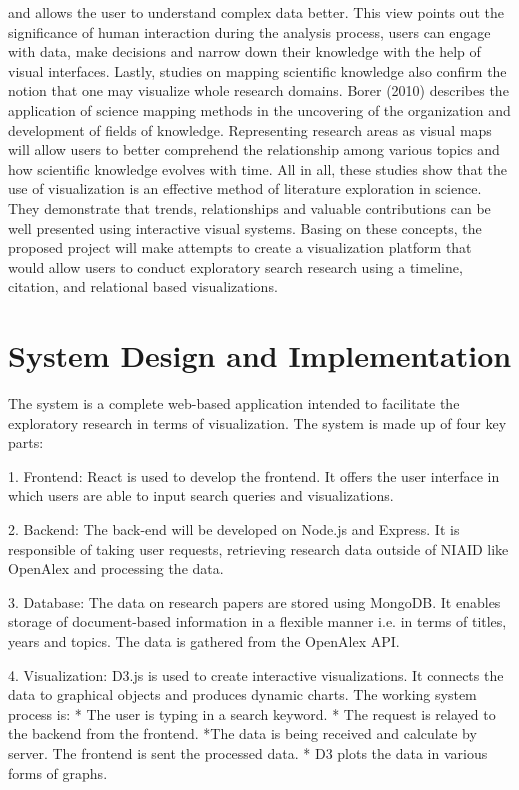 \documentclass[sigconf]{acmart}
\begin{document}
and allows the user to understand complex data better. This view points out the significance of human interaction during the analysis process, users can engage with data, make decisions and narrow down their knowledge with the help of visual interfaces. Lastly, studies on mapping scientific knowledge also confirm the notion that one may visualize whole research domains. Borer (2010) describes the application of science mapping methods in the uncovering of the organization and development of fields of knowledge. Representing research areas as visual maps will allow users to better comprehend the relationship among various topics and how scientific knowledge evolves with time. All in all, these studies show that the use of visualization is an effective method of literature exploration in science. They demonstrate that trends, relationships and valuable contributions can be well presented using interactive visual systems. Basing on these concepts, the proposed project will make attempts to create a visualization platform that would allow users to conduct exploratory search research using a timeline, citation, and relational based visualizations. 

\section{System Design and Implementation}
The system is a complete web-based application intended to facilitate the exploratory research in terms of visualization.
The system is made up of four key parts:

1. Frontend:
   React is used to develop the frontend. It offers the user interface in which users are able to input search queries and visualizations.

2. Backend:
   The back-end will be developed on Node.js and Express. It is responsible of taking user requests, retrieving research data outside of NIAID like OpenAlex and processing the data.

3. Database:
   The data on research papers are stored using MongoDB. It enables storage of document-based information in a flexible manner i.e. in terms of titles, years and topics. The data is gathered from the OpenAlex API.

4. Visualization:
   D3.js is used to create interactive visualizations. It connects the data to graphical objects and produces dynamic charts.
The working system process is:
* The user is typing in a search keyword.
* The request is relayed to the backend from the frontend.
*The data is being received and calculate by server.
The frontend is sent the processed data.
* D3 plots the data in various forms of graphs.
\end{document}
